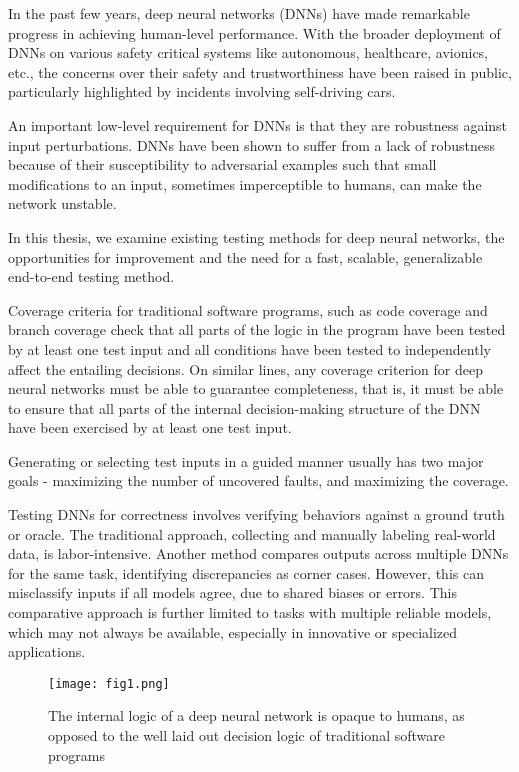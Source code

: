 In the past few years, deep neural networks (DNNs) have made remarkable progress in achieving human-level performance. With the broader deployment of DNNs on various safety critical systems like autonomous, healthcare, avionics, etc., the concerns over their safety and trustworthiness have been raised in public, particularly highlighted by incidents involving self-driving cars.

An important low-level requirement for DNNs is that they are robustness against input perturbations. DNNs have been shown to suffer from a lack of robustness because of their susceptibility to adversarial examples such that small modifications to an input, sometimes imperceptible to humans, can make the network unstable.

In this thesis, we examine existing testing methods for
deep neural networks, the opportunities for improvement and
the need for a fast, scalable, generalizable end-to-end testing
method.

Coverage criteria for traditional software programs, such as code coverage and branch coverage check that all parts of the logic in the program have been tested by at least one test input and all conditions have been tested to independently affect the entailing decisions. On similar lines, any coverage criterion for deep neural networks must be able to guarantee completeness, that is, it must be able to ensure that all parts of the internal decision-making structure of the DNN have been exercised by at least one test input.

Generating or selecting test inputs in a guided manner usually has two major goals - maximizing the number of uncovered faults, and maximizing the coverage.
	
Testing DNNs for correctness involves verifying behaviors against a ground truth or oracle. The traditional approach, collecting and manually labeling real-world data, is labor-intensive. Another method compares outputs across multiple DNNs for the same task, identifying discrepancies as corner cases. However, this can misclassify inputs if all models agree, due to shared biases or errors. This comparative approach is further limited to tasks with multiple reliable models, which may not always be available, especially in innovative or specialized applications.



\begin{figure*}[h]
	\centering
	\texttt{[image: fig1.png]}
	\caption{The internal logic of a deep neural network is opaque
	to humans, as opposed to the well laid out decision logic of
	traditional software programs \cite{Intro_1}}
	\label{fig:1}
\end{figure*}

